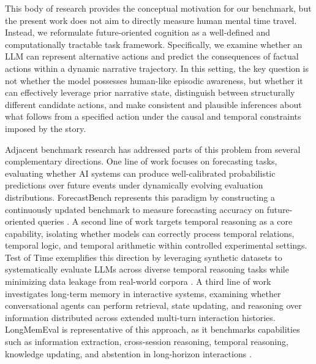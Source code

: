 \documentclass[pdflatex,sn-mathphys-num]{sn-jnl}%
\theoremstyle{thmstyleone}%
\theoremstyle{thmstyletwo}%
\theoremstyle{thmstylethree}%
\begin{document}
This body of research provides the conceptual motivation for our benchmark, but the present work does not aim to directly measure human mental time travel. Instead, we reformulate future-oriented cognition as a well-defined and computationally tractable task framework. Specifically, we examine whether an LLM can represent alternative actions and predict the consequences of factual actions within a dynamic narrative trajectory. In this setting, the key question is not whether the model possesses human-like episodic awareness, but whether it can effectively leverage prior narrative state, distinguish between structurally different candidate actions, and make consistent and plausible inferences about what follows from a specified action under the causal and temporal constraints imposed by the story.

Adjacent benchmark research has addressed parts of this problem from several complementary directions. One line of work focuses on forecasting tasks, evaluating whether AI systems can produce well-calibrated probabilistic predictions over future events under dynamically evolving evaluation distributions. ForecastBench represents this paradigm by constructing a continuously updated benchmark to measure forecasting accuracy on future-oriented queries \cite{karger2024forecastbench}. A second line of work targets temporal reasoning as a core capability, isolating whether models can correctly process temporal relations, temporal logic, and temporal arithmetic within controlled experimental settings. Test of Time exemplifies this direction by leveraging synthetic datasets to systematically evaluate LLMs across diverse temporal reasoning tasks while minimizing data leakage from real-world corpora \cite{fatemi2024test}. A third line of work investigates long-term memory in interactive systems, examining whether conversational agents can perform retrieval, state updating, and reasoning over information distributed across extended multi-turn interaction histories. LongMemEval is representative of this approach, as it benchmarks capabilities such as information extraction, cross-session reasoning, temporal reasoning, knowledge updating, and abstention in long-horizon interactions \cite{wu2024longmemeval}.
\end{document}
